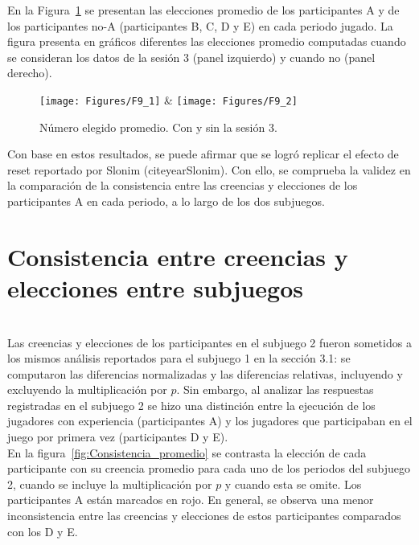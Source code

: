 En la Figura~\ref{fig:ParticipantesA_promedio} se presentan las elecciones promedio de los participantes A y de los participantes no-A (participantes B, C, D y E) en cada periodo jugado. La figura presenta en gráficos diferentes las elecciones promedio computadas cuando se consideran los datos de la sesión 3 (panel izquierdo) y cuando no (panel derecho).\\
  
\begin{figure}[h]
\centering
\texttt{[image: Figures/F9\_1]} & \texttt{[image: Figures/F9\_2]} 
\decoRule
\caption[Evaluación de las Diferencias Relativas entre creencias y elecciones en el Subjuego 1 sin la multiplicación por p (Factor de Bayes)]{Número elegido promedio. Con y sin la sesión 3.}
\label{fig:ParticipantesA_promedio}
\end{figure}  

Con base en estos resultados, se puede afirmar que se logró replicar el efecto de reset reportado por Slonim (citeyear{Slonim}). Con ello, se comprueba la validez en la comparación de la consistencia entre las creencias y elecciones de los participantes A en cada periodo, a lo largo de los dos subjuegos.\\

\section{Consistencia entre creencias y elecciones entre subjuegos}\\

Las creencias y elecciones de los participantes en el subjuego 2 fueron sometidos a los mismos análisis reportados para el subjuego 1 en la sección 3.1: se computaron las diferencias normalizadas y las diferencias relativas, incluyendo y excluyendo la multiplicación por $p$. Sin embargo, al analizar las respuestas registradas en el subjuego 2 se hizo una distinción entre la ejecución de los jugadores con experiencia (participantes A) y los jugadores que participaban en el juego por primera vez (participantes D y E).\\

En la figura~\ref{fig:Consistencia_promedio} se contrasta la elección de cada participante con su creencia promedio para cada uno de los periodos del subjuego 2, cuando se incluye la multiplicación por $p$ y cuando esta se omite. Los participantes A están marcados en rojo. En general, se observa una menor inconsistencia entre las creencias y elecciones de estos participantes comparados con los D y E.\\

